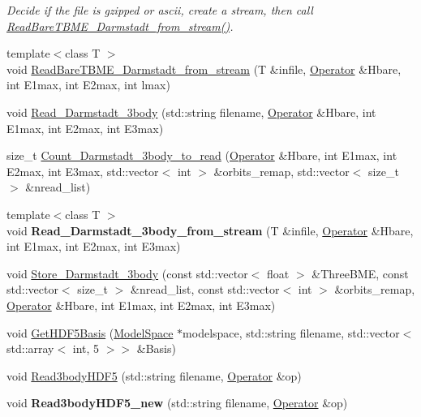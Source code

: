 \begin{DoxyCompactItemize}
\begin{DoxyCompactList}\small\item\em Decide if the file is gzipped or ascii, create a stream, then call \hyperlink{classReadWrite_a44acf6835321a8bee6a795523728da2e}{Read\-Bare\-T\-B\-M\-E\-\_\-\-Darmstadt\-\_\-from\-\_\-stream()}. \end{DoxyCompactList}\item 
{\footnotesize template$<$class T $>$ }\\void \hyperlink{classReadWrite_a44acf6835321a8bee6a795523728da2e}{Read\-Bare\-T\-B\-M\-E\-\_\-\-Darmstadt\-\_\-from\-\_\-stream} (T \&infile, \hyperlink{classOperator}{Operator} \&Hbare, int E1max, int E2max, int lmax)
\item 
void \hyperlink{classReadWrite_a5718d535d7e865cb16229cb5c7f8b16d}{Read\-\_\-\-Darmstadt\-\_\-3body} (std\-::string filename, \hyperlink{classOperator}{Operator} \&Hbare, int E1max, int E2max, int E3max)
\item 
size\-\_\-t \hyperlink{classReadWrite_a636e7da4d6fc6a96136afdbf61dddaba}{Count\-\_\-\-Darmstadt\-\_\-3body\-\_\-to\-\_\-read} (\hyperlink{classOperator}{Operator} \&Hbare, int E1max, int E2max, int E3max, std\-::vector$<$ int $>$ \&orbits\-\_\-remap, std\-::vector$<$ size\-\_\-t $>$ \&nread\-\_\-list)
\item 
\hypertarget{classReadWrite_af229332b05276f686966fdaaa98a81fd}{{\footnotesize template$<$class T $>$ }\\void {\bfseries Read\-\_\-\-Darmstadt\-\_\-3body\-\_\-from\-\_\-stream} (T \&infile, \hyperlink{classOperator}{Operator} \&Hbare, int E1max, int E2max, int E3max)}\label{classReadWrite_af229332b05276f686966fdaaa98a81fd}

\item 
void \hyperlink{classReadWrite_a8c1bcfaf580336f44afe3c794029f678}{Store\-\_\-\-Darmstadt\-\_\-3body} (const std\-::vector$<$ float $>$ \&Three\-B\-M\-E, const std\-::vector$<$ size\-\_\-t $>$ \&nread\-\_\-list, const std\-::vector$<$ int $>$ \&orbits\-\_\-remap, \hyperlink{classOperator}{Operator} \&Hbare, int E1max, int E2max, int E3max)
\item 
void \hyperlink{classReadWrite_afd7a125b17416dff8f734552162f9452}{Get\-H\-D\-F5\-Basis} (\hyperlink{classModelSpace}{Model\-Space} $\ast$modelspace, std\-::string filename, std\-::vector$<$ std\-::array$<$ int, 5 $>$$>$ \&Basis)
\item 
void \hyperlink{classReadWrite_aecf5aed45944f3bd24c376478ee939dc}{Read3body\-H\-D\-F5} (std\-::string filename, \hyperlink{classOperator}{Operator} \&op)
\item 
\hypertarget{classReadWrite_a4f698e59260545020e81e712b8ebd082}{void {\bfseries Read3body\-H\-D\-F5\-\_\-new} (std\-::string filename, \hyperlink{classOperator}{Operator} \&op)}\label{classReadWrite_a4f698e59260545020e81e712b8ebd082}


\end{DoxyCompactItemize}
